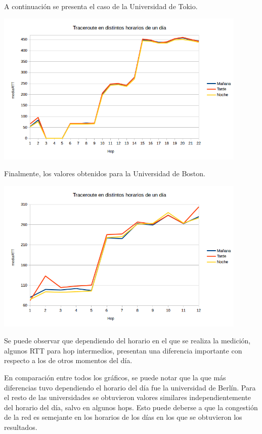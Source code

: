 A continuación se presenta el caso de la Universidad de Tokio.

\centerline{\includegraphics[width=0.9\textwidth]{imagenes/1ra_parte/trace_distintos_horarios_japon.png}}

Finalmente, los valores obtenidos para la Universidad de Boston. 

\centerline{\includegraphics[width=0.9\textwidth]{imagenes/1ra_parte/trace_distintos_horarios_eeuu.png}}

Se puede observar que dependiendo del horario en el que se realiza la medición, algunos RTT para hop intermedios, presentan 
una diferencia importante con respecto a los de otros momentos del día. 

En comparación entre todos los gráficos, se puede notar que la que más diferencias tuvo dependiendo el horario del día fue la universidad de Berlín. 
Para el resto de las universidades se obtuvieron valores similares independientemente del horario del día, salvo en algunos hops. Esto puede deberse 
a que la congestión de la red es semejante en los horarios de los días en los que se obtuvieron los resultados.


